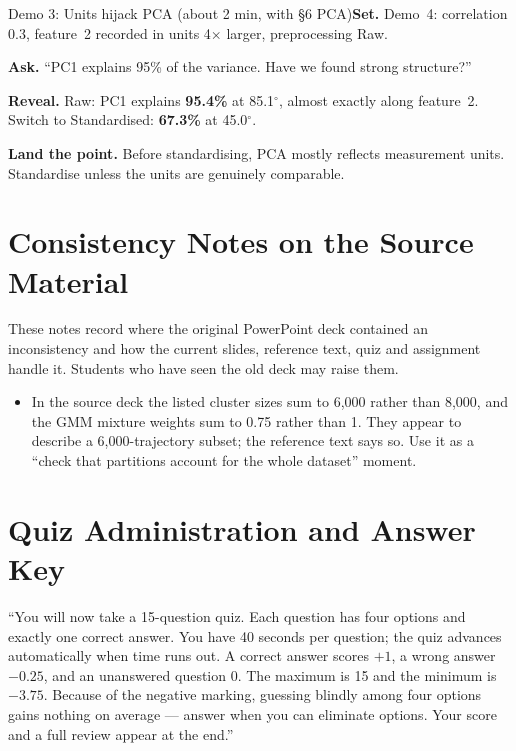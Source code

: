 \documentclass[11pt]{article}
\begin{document}
\begin{live}{Demo 3: Units hijack PCA (about 2 min, with \S6 PCA)}\textbf{Set.} Demo~4: correlation 0.3, feature~2 recorded in units 4$\times$ larger, preprocessing \textsf{Raw}.\par\smallskip\textbf{Ask.} ``PC1 explains 95\% of the variance. Have we found strong structure?''\par\smallskip\textbf{Reveal.} Raw: PC1 explains \textbf{95.4\%} at 85.1$^\circ$, almost exactly along feature~2. Switch to \textsf{Standardised}: \textbf{67.3\%} at 45.0$^\circ$.\par\smallskip\textbf{Land the point.} Before standardising, PCA mostly reflects measurement units. Standardise unless the units are genuinely comparable.\end{live}

\section{Consistency Notes on the Source Material}These notes record where the original PowerPoint deck contained an inconsistency and how the current slides, reference text, quiz and assignment handle it. Students who have seen the old deck may raise them.\begin{itemize}\item In the source deck the listed cluster sizes sum to 6,000 rather than 8,000, and the GMM mixture weights sum to 0.75 rather than 1. They appear to describe a 6,000-trajectory subset; the reference text says so. Use it as a ``check that partitions account for the whole dataset'' moment.\end{itemize}

\section{Quiz Administration and Answer Key}

\begin{sayit}``You will now take a 15-question quiz. Each question has four options and exactly one correct answer. You have 40 seconds per question; the quiz advances automatically when time runs out. A correct answer scores $+1$, a wrong answer $-0.25$, and an unanswered question 0. The maximum is 15 and the minimum is $-3.75$. Because of the negative marking, guessing blindly among four options gains nothing on average --- answer when you can eliminate options. Your score and a full review appear at the end.''\end{sayit}
\end{document}
